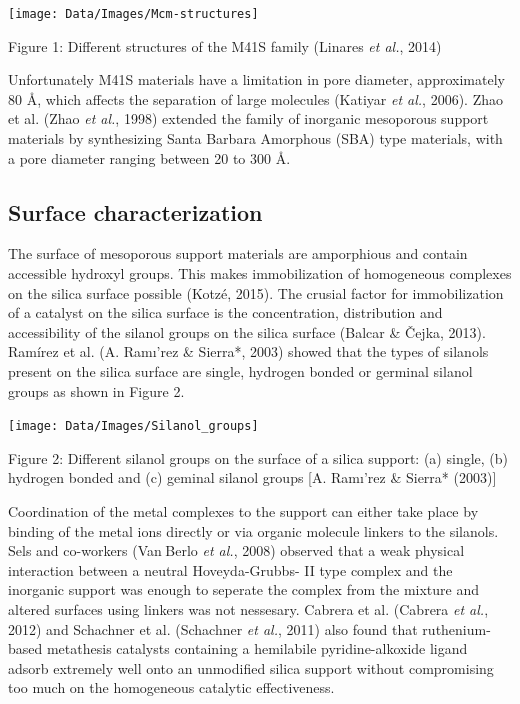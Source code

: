 \documentclass[]{article}
\begin{document}
\begin{center}\texttt{[image: Data/Images/Mcm-structures]} \end{center}

Figure 1: Different structures of the M41S family (Linares \emph{et
al.}, 2014)

Unfortunately M41S materials have a limitation in pore diameter,
approximately 80 Å, which affects the separation of large molecules
(Katiyar \emph{et al.}, 2006). Zhao et al. (Zhao \emph{et al.}, 1998)
extended the family of inorganic mesoporous support materials by
synthesizing Santa Barbara Amorphous (SBA) type materials, with a pore
diameter ranging between 20 to 300 Å.

\hypertarget{surface-characterization}{%
\subsection{Surface characterization}\label{surface-characterization}}

The surface of mesoporous support materials are amporphious and contain
accessible hydroxyl groups. This makes immobilization of homogeneous
complexes on the silica surface possible (Kotzé, 2015). The crusial
factor for immobilization of a catalyst on the silica surface is the
concentration, distribution and accessibility of the silanol groups on
the silica surface (Balcar \& Čejka, 2013). Ramírez et al. (A. Ramı'rez
\& Sierra*, 2003) showed that the types of silanols present on the
silica surface are single, hydrogen bonded or germinal silanol groups as
shown in Figure 2.

\begin{center}\texttt{[image: Data/Images/Silanol\_groups]} \end{center}

Figure 2: Different silanol groups on the surface of a silica support:
(a) single, (b) hydrogen bonded and (c) geminal silanol groups {[}A.
Ramı'rez \& Sierra* (2003){]}

Coordination of the metal complexes to the support can either take place
by binding of the metal ions directly or via organic molecule linkers to
the silanols. Sels and co-workers (Van Berlo \emph{et al.}, 2008)
observed that a weak physical interaction between a neutral
Hoveyda-Grubbs- II type complex and the inorganic support was enough to
seperate the complex from the mixture and altered surfaces using linkers
was not nessesary. Cabrera et al. (Cabrera \emph{et al.}, 2012) and
Schachner et al. (Schachner \emph{et al.}, 2011) also found that
ruthenium-based metathesis catalysts containing a hemilabile
pyridine-alkoxide ligand adsorb extremely well onto an unmodified silica
support without compromising too much on the homogeneous catalytic
effectiveness.
\end{document}
